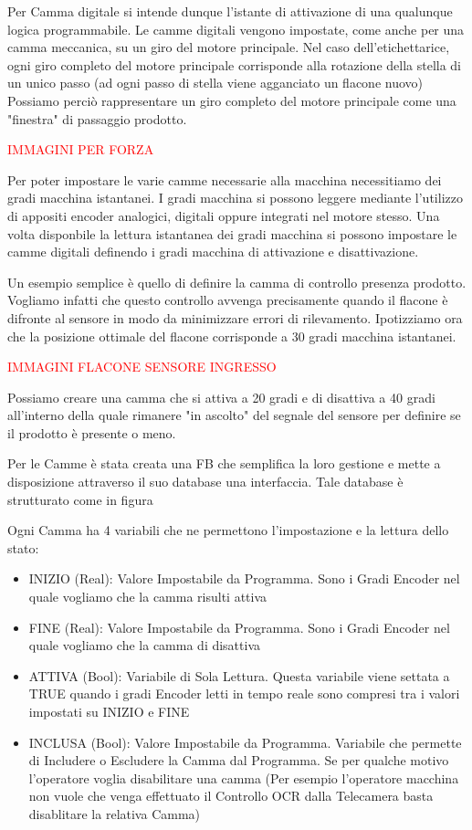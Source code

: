 \documentclass[12pt, a4paper, oneside]{book}
\begin{document}
Per Camma digitale si intende dunque l'istante di attivazione di una qualunque logica programmabile. Le camme digitali vengono impostate, come anche per una camma meccanica, su un giro del motore principale.
Nel caso dell'etichettarice, ogni giro completo del motore principale corrisponde alla rotazione della stella di un unico passo (ad ogni passo di stella viene agganciato un flacone nuovo)
Possiamo perciò rappresentare un giro completo del motore principale come una "finestra" di passaggio prodotto.

 \textcolor{red}{IMMAGINI PER FORZA}

Per poter impostare le varie camme necessarie alla macchina necessitiamo dei gradi macchina istantanei. I gradi macchina si possono leggere mediante l'utilizzo di appositi encoder analogici, digitali oppure integrati nel motore stesso.
Una volta disponbile la lettura istantanea dei gradi macchina si possono impostare le camme digitali definendo i gradi macchina di attivazione e disattivazione. 

Un esempio semplice è quello di definire la camma di controllo presenza prodotto. Vogliamo infatti che questo controllo avvenga precisamente quando il flacone è difronte al sensore in modo da minimizzare errori di rilevamento.
Ipotizziamo ora che la posizione ottimale del flacone corrisponde a 30 gradi macchina istantanei. 

\textcolor{red}{IMMAGINI FLACONE SENSORE INGRESSO}

Possiamo creare una camma che si attiva a 20 gradi e di disattiva a 40 gradi all'interno della quale rimanere "in ascolto" del segnale del sensore per definire se il prodotto è presente o meno.

Per le Camme è stata creata una FB che semplifica la loro gestione e mette a disposizione attraverso il suo database una interfaccia. Tale database è strutturato come in figura

Ogni Camma ha 4 variabili che ne permettono l'impostazione e la lettura dello stato:
\begin{itemize}
	\item INIZIO (Real): Valore Impostabile da Programma. Sono i Gradi Encoder nel quale vogliamo che la camma risulti attiva
	\item FINE (Real): Valore Impostabile da Programma. Sono i Gradi Encoder nel quale vogliamo che la camma di disattiva
	\item ATTIVA (Bool): Variabile di Sola Lettura. Questa variabile viene settata a TRUE quando i gradi Encoder letti in tempo reale sono compresi tra i valori impostati su INIZIO e FINE
	\item INCLUSA (Bool): Valore Impostabile da Programma. Variabile che permette di Includere o Escludere la Camma dal Programma. Se per qualche motivo l'operatore voglia disabilitare una camma (Per esempio l'operatore macchina non vuole che venga effettuato il Controllo OCR dalla Telecamera basta disablitare la relativa Camma)
\end{itemize}
\end{document}
